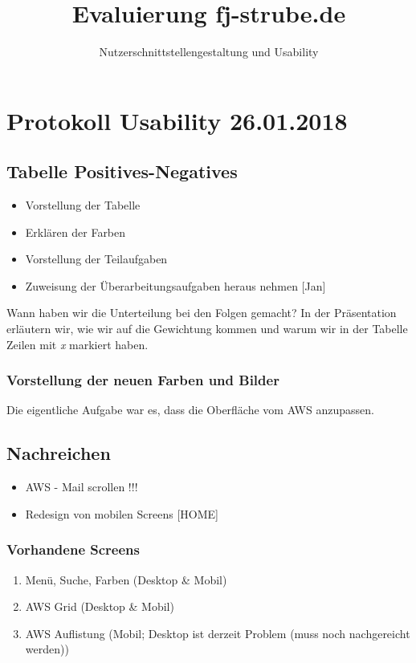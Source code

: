 \documentclass{scrartcl}
\title{Evaluierung fj-strube.de}
\subtitle{Nutzerschnittstellen\-gestaltung und Usability}
\author{Jan Brose\texorpdfstring{\strut\\}{, }
Simon Retsch\texorpdfstring{\strut\\}{, }
Eric Schmidtgen\texorpdfstring{\strut\\}{, }
Ben Schönherr\texorpdfstring{\strut\\}{, }
Falk-Jonatan Strube}
\begin{document}
\section{Protokoll Usability 26.01.2018}

\subsection{Tabelle Positives-Negatives}
\begin{itemize}
	\item Vorstellung der Tabelle
	\item Erklären der Farben
	\item Vorstellung der Teilaufgaben
	\item Zuweisung der Überarbeitungsaufgaben heraus nehmen [Jan]
\end{itemize}
Wann haben wir die Unterteilung bei den Folgen gemacht? In der Präsentation erläutern wir, wie wir auf die Gewichtung kommen und warum wir in der Tabelle Zeilen mit \textit{x} markiert haben.\\
\subsubsection*{Vorstellung der neuen Farben und Bilder}
Die eigentliche Aufgabe war es, dass die Oberfläche vom AWS anzupassen.\\

\subsection{Nachreichen}
\begin{itemize}
	\item AWS - Mail scrollen !!!
	\item Redesign von mobilen Screens [HOME]
\end{itemize}

\subsubsection{Vorhandene Screens}
\begin{enumerate}
	\item Menü, Suche, Farben (Desktop \& Mobil)
	\item AWS Grid (Desktop \& Mobil)
	\item AWS Auflistung (Mobil; Desktop ist derzeit Problem (muss noch nachgereicht werden))
\end{enumerate}
\end{document}
